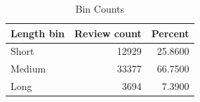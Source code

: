 \begin{table}
\caption{Bin Counts}
\label{tab:bin_counts}
\begin{tabular}{lrr}
\toprule
Length bin & Review count & Percent \\
\midrule
Short & 12929 & 25.8600 \\
Medium & 33377 & 66.7500 \\
Long & 3694 & 7.3900 \\
\bottomrule
\end{tabular}
\end{table}
